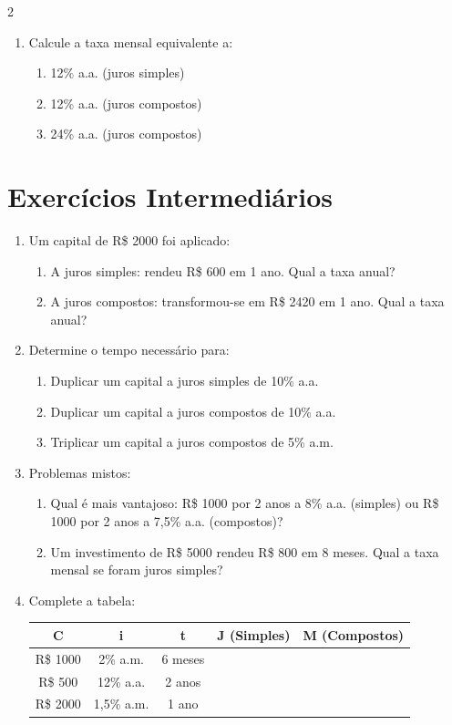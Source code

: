 \documentclass[11pt]{article}
\begin{document}
\begin{multicols}{2}
\begin{enumerate}[leftmargin=*]
\item Calcule a taxa mensal equivalente a:
\begin{enumerate}[label=\alph*)]
\item 12\% a.a. (juros simples)
\item 12\% a.a. (juros compostos)
\item 24\% a.a. (juros compostos)
\end{enumerate}

\end{enumerate}

\section*{Exercícios Intermediários}

\begin{enumerate}[leftmargin=*, start=6]

\item Um capital de R\$ 2000 foi aplicado:
\begin{enumerate}[label=\alph*)]
\item A juros simples: rendeu R\$ 600 em 1 ano. Qual a taxa anual?
\item A juros compostos: transformou-se em R\$ 2420 em 1 ano. Qual a taxa anual?
\end{enumerate}

\item Determine o tempo necessário para:
\begin{enumerate}[label=\alph*)]
\item Duplicar um capital a juros simples de 10\% a.a.
\item Duplicar um capital a juros compostos de 10\% a.a.
\item Triplicar um capital a juros compostos de 5\% a.m.
\end{enumerate}

\item Problemas mistos:
\begin{enumerate}[label=\alph*)]
\item Qual é mais vantajoso: 
  R\$ 1000 por 2 anos a 8\% a.a. (simples) ou
  R\$ 1000 por 2 anos a 7,5\% a.a. (compostos)?
\item Um investimento de R\$ 5000 rendeu R\$ 800 em 8 meses. 
  Qual a taxa mensal se foram juros simples?
\end{enumerate}

\item Complete a tabela:
\begin{center}
\begin{tabular}{|c|c|c|c|c|}
\hline
\textbf{C} & \textbf{i} & \textbf{t} & \textbf{J (Simples)} & \textbf{M (Compostos)} \\
\hline
R\$ 1000 & 2\% a.m. & 6 meses & & \\
\hline
R\$ 500 & 12\% a.a. & 2 anos & & \\
\hline
R\$ 2000 & 1,5\% a.m. & 1 ano & & \\
\hline
\end{tabular}
\end{center}


\end{enumerate}
\end{multicols}
\end{document}
